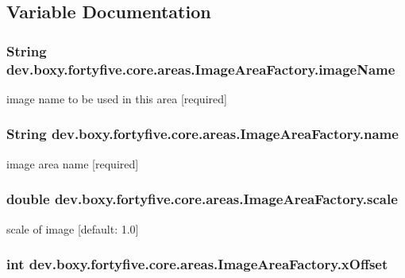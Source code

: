 \subsection{Variable Documentation}
\hypertarget{group___image_area_ga8438aa6e7397dd740b77fe0fbf660936}{
\subsubsection[{imageName}]{\setlength{\rightskip}{0pt plus 5cm}String {\bf dev.boxy.fortyfive.core.areas.ImageAreaFactory.imageName}}}
\label{d5/d15/group___image_area_ga8438aa6e7397dd740b77fe0fbf660936}
image name to be used in this area \mbox{[}required\mbox{]} \hypertarget{group___image_area_gaa9289d9690489b0fd14e7091530970b7}{
\subsubsection[{name}]{\setlength{\rightskip}{0pt plus 5cm}String {\bf dev.boxy.fortyfive.core.areas.ImageAreaFactory.name}}}
\label{d5/d15/group___image_area_gaa9289d9690489b0fd14e7091530970b7}
image area name \mbox{[}required\mbox{]} \hypertarget{group___image_area_ga8bf0ff1badd6a9a4c2244a555f24406b}{
\subsubsection[{scale}]{\setlength{\rightskip}{0pt plus 5cm}double {\bf dev.boxy.fortyfive.core.areas.ImageAreaFactory.scale}}}
\label{d5/d15/group___image_area_ga8bf0ff1badd6a9a4c2244a555f24406b}
scale of image \mbox{[}default: 1.0\mbox{]} \hypertarget{group___image_area_ga8f5f4265e2db6213e49b143287bdb5d9}{
\subsubsection[{xOffset}]{\setlength{\rightskip}{0pt plus 5cm}int {\bf dev.boxy.fortyfive.core.areas.ImageAreaFactory.xOffset}}}
